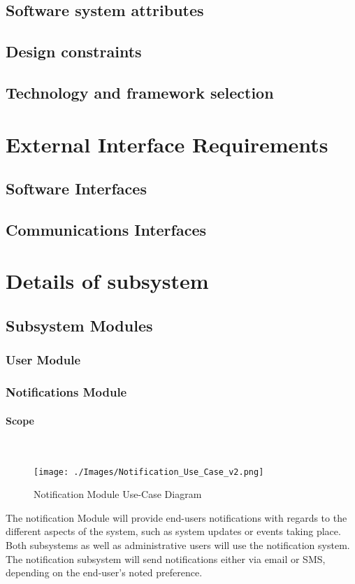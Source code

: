 \documentclass{article}
\begin{document}
		\subsection{Software system attributes}
		\subsection{Design constraints}
		\subsection{Technology and framework selection}
		
		
	\section{External Interface Requirements}
		\subsection{Software Interfaces}
		\subsection{Communications Interfaces}
		
	\newpage	
	\section{Details of subsystem}
	\subsection{Subsystem Modules}
		\subsubsection{User Module}
		\subsubsection{Notifications Module}
			\paragraph	{Scope}\mbox{} \\
				\begin{figure}[h]
					\texttt{[image: ./Images/Notification\_Use\_Case\_v2.png]} 
					\caption{Notification Module Use-Case Diagram}
				\end{figure}
			
				{The notification Module will provide end-users notifications with regards to the different aspects of the system, such as system updates or events taking place. Both subsystems as well as administrative users will use the notification system. The notification subsystem will send notifications either via email or SMS, depending on the end-user's noted preference.}		
		
\end{document}
